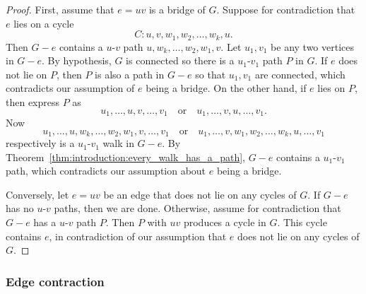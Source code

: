 \begin{proof}
First, assume that $e = uv$ is a bridge of $G$. Suppose for
contradiction that $e$ lies on a cycle
\[
C: u, v, w_1, w_2, \dots, w_k, u.
\]
Then $G - e$ contains a $u$-$v$ path
$u, w_k, \dots, w_2, w_1, v$. Let $u_1, v_1$ be any two vertices in
$G - e$. By hypothesis, $G$ is connected so there is a $u_1$-$v_1$
path $P$ in $G$. If $e$ does not lie on $P$, then $P$ is also a path
in $G - e$ so that $u_1, v_1$ are connected, which contradicts our
assumption of $e$ being a bridge. On the other hand, if $e$ lies on
$P$, then express $P$ as
\[
u_1, \dots, u, v, \dots, v_1
\quad\text{or}\quad
u_1, \dots, v, u, \dots, v_1.
\]
Now
\[
u_1, \dots, u, w_k, \dots, w_2, w_1, v, \dots, v_1
\quad\text{or}\quad
u_1, \dots, v, w_1, w_2, \dots, w_k, u, \dots, v_1
\]
respectively is a $u_1$-$v_1$ walk in $G - e$. By
Theorem~\ref{thm:introduction:every_walk_has_a_path}, $G - e$
contains a $u_1$-$v_1$ path, which contradicts our assumption about
$e$ being a bridge.

Conversely, let $e = uv$ be an edge that does not lie on any cycles of
$G$. If $G - e$ has no $u$-$v$ paths, then we are done. Otherwise,
assume for contradiction that $G - e$ has a $u$-$v$ path $P$. Then $P$
with $uv$ produces a cycle in $G$. This cycle contains $e$, in
contradiction of our assumption that $e$ does not lie on any cycles of
$G$.
\end{proof}



\subsubsection{Edge contraction}

